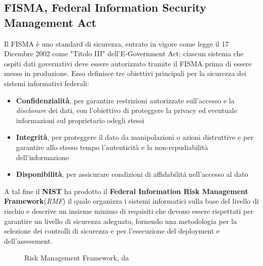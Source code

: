 \documentclass[../main.tex]{subfiles}
\begin{document}
\subsection{FISMA, Federal Information Security Management Act}
Il FISMA è uno standard di sicurezza, entrato in vigore come legge il 17 Dicembre 2002 come "Titolo III" dell'E-Government Act\cite{united2004information}: ciascun sistema che ospiti dati governativi deve essere autorizzato tramite il FISMA prima di essere messo in produzione.
Esso definisce tre obiettivi principali per la sicurezza dei sistemi informativi federali:
\begin{itemize}
    \item \textbf{Confidenzialità}, per garantire restrizioni autorizzate sull'accesso e la \textit{disclosure} dei dati, con l'obiettivo di proteggere la privacy ed eventuale informazioni sul proprietario odegli stessi
    \item \textbf{Integrità}, per proteggere il dato da manipolazioni o azioni distruttive e per garantire allo stesso tempo l'autenticità e la non-repudiabilità dell'informazione
    \item \textbf{Disponibilità}, per assicurare condizioni di affidabilità nell'accesso al dato
\end{itemize}

A tal fine il \textbf{NIST} ha prodotto il \textbf{Federal Information Risk Management Framework}(\textit{RMF}) il quale organizza i sistemi informatici sulla base del livello di rischio e descrive un insieme minimo di requisiti che devono essere rispettati per garantire un livello di sicurezza adeguato\cite{nist2003nist}, fornendo una metodologia per la selezione dei controlli di sicurezza e per l'esecuzione del deployment e dell'assessment.

\begin{figure}[H]
\centering
{}
\caption{Risk Management Framework, da \cite{nist2003nist} }\label{fig:riskmanagementfw}
\end{figure}
\end{document}

